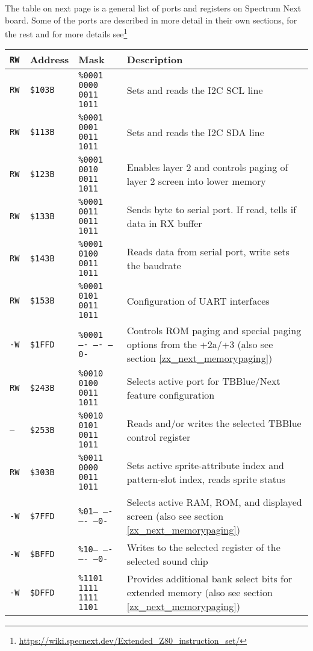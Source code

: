 \documentclass[twoside,openright,a4paper]{book}
\newcommand{\notet}{\rule{0pt}{2.4ex}}
\begin{document}
The table on next page is a general list of ports and registers on Spectrum Next board. Some of the ports are described in more detail in their own sections, for the rest and for more details see\footnote{
\url{https://wiki.specnext.dev/Extended_Z80_instruction_set/}}

\newcommand{\zxport}[4]{\tt {#1}\notet & {\tt \$#2} & {\tt \%#3} & #4}

\begin{tabular}{lllp{7.5cm}}
	{\tt RW} & Address & Mask & Description \\
	
	\hline
	
	\zxport{RW}{103B}{0001 0000 0011 1011}{Sets and reads the I2C SCL line} \\
	\zxport{RW}{113B}{0001 0001 0011 1011}{Sets and reads the I2C SDA line} \\
	\zxport{RW }{123B}{0001 0010 0011 1011}{Enables layer 2 and controls paging of layer 2 screen into lower memory} \\
	\zxport{RW}{133B}{0001 0011 0011 1011}{Sends byte to serial port. If read, tells if data in RX buffer} \\
	\zxport{RW}{143B}{0001 0100 0011 1011}{Reads data from serial port, write sets the baudrate} \\
	\zxport{RW}{153B}{0001 0101 0011 1011}{Configuration of UART interfaces} \\
	\zxport{-W}{1FFD}{0001 ---- ---- --0-}{Controls ROM paging and special paging options from the +2a/+3 (also see section \ref{zx_next_memorypaging})} \\
	\zxport{RW}{243B}{0010 0100 0011 1011}{Selects active port for TBBlue/Next feature configuration} \\
	\zxport{--}{253B}{0010 0101 0011 1011}{Reads and/or writes the selected TBBlue control register} \\
	\zxport{RW}{303B}{0011 0000 0011 1011}{Sets active sprite-attribute index and pattern-slot index, reads sprite status} \\
	\zxport{-W}{7FFD}{01-- ---- ---- --0-}{Selects active RAM, ROM, and displayed screen (also see section \ref{zx_next_memorypaging})} \\
	\zxport{-W}{BFFD}{10-- ---- ---- --0-}{Writes to the selected register of the selected sound chip} \\
	\zxport{-W}{DFFD}{1101 1111 1111 1101}{Provides additional bank select bits for extended memory (also see section \ref{zx_next_memorypaging})} \\

\end{tabular}
\end{document}
